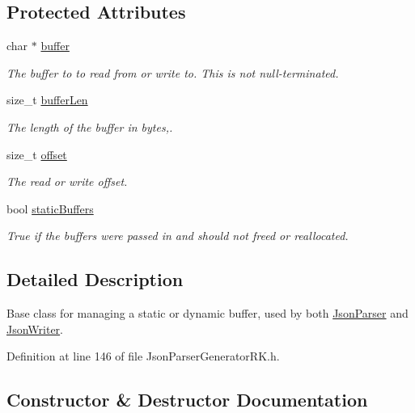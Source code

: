 \subsection*{Protected Attributes}
\begin{DoxyCompactItemize}
\item 
char $\ast$ \hyperlink{class_json_buffer_aaee27fe51d12d68bd6031df3bc78b6b5}{buffer}
\begin{DoxyCompactList}\small\item\em The buffer to to read from or write to. This is not null-\/terminated. \end{DoxyCompactList}\item 
size\+\_\+t \hyperlink{class_json_buffer_af06130f43f71623ea6afe049c846e52b}{buffer\+Len}
\begin{DoxyCompactList}\small\item\em The length of the buffer in bytes,. \end{DoxyCompactList}\item 
size\+\_\+t \hyperlink{class_json_buffer_aeb1ab3291108f351834f2e8c6784538c}{offset}
\begin{DoxyCompactList}\small\item\em The read or write offset. \end{DoxyCompactList}\item 
bool \hyperlink{class_json_buffer_a729845e25c624d1dcb1da9712afbcdf7}{static\+Buffers}
\begin{DoxyCompactList}\small\item\em True if the buffers were passed in and should not freed or reallocated. \end{DoxyCompactList}\end{DoxyCompactItemize}


\subsection{Detailed Description}
Base class for managing a static or dynamic buffer, used by both \hyperlink{class_json_parser}{Json\+Parser} and \hyperlink{class_json_writer}{Json\+Writer}. 

Definition at line 146 of file Json\+Parser\+Generator\+R\+K.\+h.



\subsection{Constructor \& Destructor Documentation}
\mbox{\label{class_json_buffer_a7198fe2dc430c6ebbc2374698c86f932}} 
